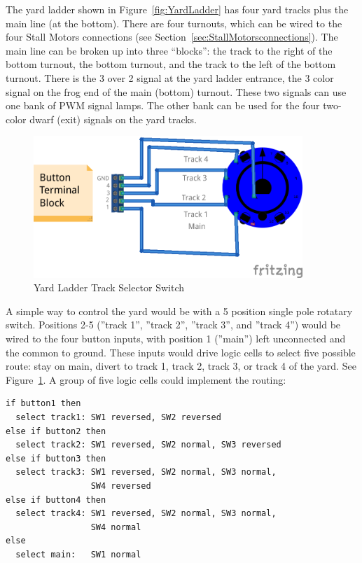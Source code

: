 The yard ladder shown in Figure~\ref{fig:YardLadder} has four yard tracks plus
the main line (at the bottom). There are four turnouts, which can be wired to
the four Stall Motors connections (see
Section~\ref{sec:StallMotorsconnections}). The main line can be broken up into
three ``blocks'': the track to the right of the bottom turnout, the bottom
turnout, and the track to the left of the bottom turnout. There is the 3 over
2 signal at the yard ladder entrance, the 3 color signal on the frog end of
the main (bottom) turnout. These two signals can use one bank of PWM signal
lamps. The other bank can be used for the four two-color dwarf (exit) signals
on the yard tracks. 
\begin{figure}[hbpt]\begin{centering}%
\includegraphics[width=4in]{ESP32S3-YardLadderRouteSelector_bb.png}
\caption{Yard Ladder Track Selector Switch}
\label{fig:YardLadderTrackSelectorSwitch}
\end{centering}\end{figure}
A simple way to control the yard would be with a 5 position single pole
rotatary switch. Positions 2-5 (''track 1'', ''track 2'', ''track 3'', and
''track 4'') would be wired to the four button inputs, with position 1
(''main'') left unconnected and the common to ground. These inputs would drive
logic cells to select five possible route: stay on main, divert to track 1,
track 2, track 3, or track 4 of the yard. See 
Figure~\ref{fig:YardLadderTrackSelectorSwitch}. A group of five logic cells 
could implement the routing:

\begin{verbatim}
if button1 then
  select track1: SW1 reversed, SW2 reversed
else if button2 then 
  select track2: SW1 reversed, SW2 normal, SW3 reversed
else if button3 then
  select track3: SW1 reversed, SW2 normal, SW3 normal,
                 SW4 reversed
else if button4 then
  select track4: SW1 reversed, SW2 normal, SW3 normal,
                 SW4 normal
else
  select main:   SW1 normal
\end{verbatim}

